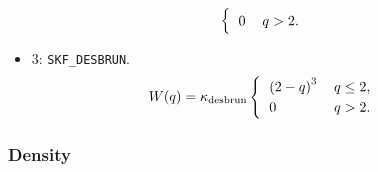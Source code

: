\begin{itemize}
\begin{equation}
\begin{cases}
\begin{tabular}{l l}
              0
              &
              $q > 2$.
          \end{tabular}  
        \end{cases} 
    \end{equation}
    
    \item 3: \verb|SKF_DESBRUN|.
    \begin{equation}
        W(q) = \kappa_{\text{desbrun}}
        \begin{cases}
          \begin{tabular}{l l}
              $\displaystyle{\left(2 - q
              \right)^3}$
              &
              $q \leq 2$, 
              
              \\
              
              0
              &
              $q > 2$.
          \end{tabular}  
        \end{cases} 
    \end{equation}
\end{itemize}


\subsubsection{Density}

